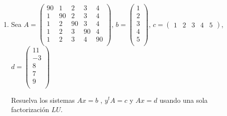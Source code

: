 \documentclass[12pt,letterpaper]{article}
\theoremstyle{plain}
\begin{document}
\begin{enumerate}
\item Sea $A=\left(\begin{array}{ccccc}
                    90 & 1 & 2 & 3 & 4\\
1 & 90 & 2 & 3 & 4\\
 1 & 2 & 90 & 3 & 4\\
 1 & 2 & 3 & 90 & 4\\
 1 & 2 & 3 & 4 & 90\\
                   \end{array}
\right)$, $b=\left(\begin{array}{c}
                     1 \\
 2 \\
 3 \\
 4\\
 5\\
                   \end{array}
\right)$, $c= \left(\begin{array}{ccccc}
                    1 & 2 & 3 & 4 & 5
                   \end{array}
\right)$, $d=\left(\begin{array}{c}
                     11 \\
 -3 \\
 8 \\
 7\\
 9\\
                   \end{array}
\right)$

Resuelva los sistemas $Ax = b$ , $y^tA = c$ y $Ax = d$ usando una sola factorizaci\'on $LU$.

\end{enumerate}
\end{document}
